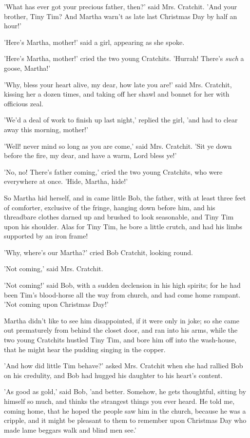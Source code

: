 'What has ever got your precious father, then?' said Mrs. Cratchit. 'And
your brother, Tiny Tim? And Martha warn't as late last Christmas Day by
half an hour!'

'Here's Martha, mother!' said a girl, appearing as she spoke.

'Here's Martha, mother!' cried the two young Cratchits. 'Hurrah! There's
\emph{such} a goose, Martha!'

'Why, bless your heart alive, my dear, how late you are!' said Mrs.
Cratchit, kissing her a dozen times, and taking off her shawl and bonnet
for her with officious zeal.

'We'd a deal of work to finish up last night,' replied the girl, 'and
had to clear away this morning, mother!'

'Well! never mind so long as you are come,' said Mrs. Cratchit. 'Sit ye
down before the fire, my dear, and have a warm, Lord bless ye!'

'No, no! There's father coming,' cried the two young Cratchits, who were
everywhere at once. 'Hide, Martha, hide!'

So Martha hid herself, and in came little Bob, the father, with at least
three feet of comforter, exclusive of the fringe, hanging down before
him, and his threadbare clothes darned up and brushed to look
seasonable, and Tiny Tim upon his shoulder. Alas for Tiny Tim, he bore a
little crutch, and had his limbs supported by an iron frame!

'Why, where's our Martha?' cried Bob Cratchit, looking round.

'Not coming,' said Mrs. Cratchit.

'Not coming!' said Bob, with a sudden declension in his high spirits;
for he had been Tim's blood-horse all the way from church, and had come
home rampant. 'Not coming upon Christmas Day!'

Martha didn't like to see him disappointed, if it were only in joke; so
she came out prematurely from behind the closet door, and ran into his
arms, while the two young Cratchits hustled Tiny Tim, and bore him off
into the wash-house, that he might hear the pudding singing in the
copper.

'And how did little Tim behave?' asked Mrs. Cratchit when she had
rallied Bob on his credulity, and Bob had hugged his daughter to his
heart's content.

'As good as gold,' said Bob, 'and better. Somehow, he gets thoughtful,
sitting by himself so much, and thinks the strangest things you ever
heard. He told me, coming home, that he hoped the people saw him in the
church, because he was a cripple, and it might be pleasant to them to
remember upon Christmas Day who made lame beggars walk and blind men
see.'


